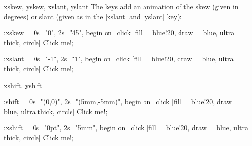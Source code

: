 \begin{tikzanimateattribute}{xskew, yskew, xslant, yslant}
  The keys add an animation of the skew (given in degrees) or slant
  (given as in the |xslant| and |yslant| key):
\begin{codeexample}[animation list={0.5,1,1.5,2}]
\tikz \node :xskew = { 0s="0", 2s="45", begin on=click}
  [fill = blue!20, draw = blue, ultra thick, circle] {Click me!}; 
\end{codeexample}
\begin{codeexample}[animation list={0.5,1,1.5,2}]
\tikz \node :xslant = { 0s="-1", 2s="1", begin on=click}
  [fill = blue!20, draw = blue, ultra thick, circle] {Click me!}; 
\end{codeexample}
\end{tikzanimateattribute}

\begin{tikzanimateattribute}{xshift, yshift}
\begin{codeexample}[animation list={0.5,1,1.5,2}]
\tikz \node :shift = { 0s="{(0,0)}", 2s="{(5mm,-5mm)}",
                       begin on=click}
  [fill = blue!20, draw = blue, ultra thick, circle] {Click me!}; 
\end{codeexample}
\begin{codeexample}[animation list={0.5,1,1.5,2}]
\tikz \node :xshift = { 0s="0pt", 2s="5mm", begin on=click}
  [fill = blue!20, draw = blue, ultra thick, circle] {Click me!}; 
\end{codeexample}
\end{tikzanimateattribute}


